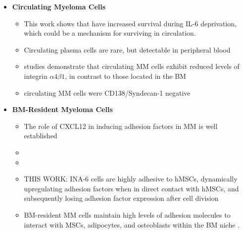 \begin{itemize}
      \item \textbf{Circulating Myeloma Cells}
            \begin{itemize}
                  \item This work shows that \nMAina have increased survival
                        during IL-6 deprivation, which could be a mechanism for
                        surviving in circulation.
                  \item Circulating plasma cells are rare, but detectable in
                        peripheral blood
                        \cite{witzigDetectionMyelomaCells1996}
                  \item studies demonstrate that circulating \ac{MM} cells
                        exhibit reduced levels of integrin $\alpha4\beta1$, in
                        contrast to those located in the \ac{BM}
                        \cite{paivaDetailedCharacterizationMultiple2013,
                              paivaCompetitionClonalPlasma2011}
                  \item circulating MM cells were CD138/Syndecan-1 negative
                        \cite{akhmetzyanovaDynamicCD138Surface2020}

            \end{itemize}

      \item \textbf{BM-Resident Myeloma Cells}
            \begin{itemize}
                  \item The role of CXCL12  in inducing adhesion factors in MM is well established
                  \item
                  \item
                  \item THIS WORK: INA-6 cells are highly adhesive to hMSCs, dynamically
                        upregulating adhesion factors when in direct contact with
                        hMSCs, and subsequently losing adhesion factor expression after
                        cell division

                  \item BM-resident MM cells maintain high levels of adhesion
                        molecules to interact with MSCs, adipocytes, and osteoblasts
                        within the BM niche \cite{bouzerdanAdhesionMoleculesMultiple2022, burgerGp130RasMediated2001, chatterjeePresenceBoneMarrow2002}.
            \end{itemize}

\end{itemize}

